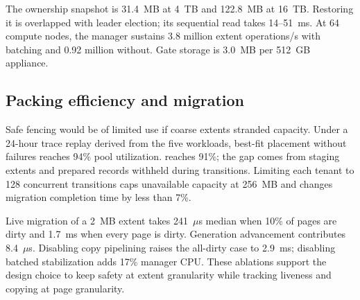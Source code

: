 The ownership snapshot is 31.4~MB at 4~TB and 122.8~MB at 16~TB. Restoring it
is overlapped with leader election; its sequential read takes 14--51~ms. At
64 compute nodes, the manager sustains 3.8 million extent operations/s with
batching and 0.92 million without. Gate storage is 3.0~MB per 512~GB appliance.

\subsection{Packing efficiency and migration}

Safe fencing would be of limited use if coarse extents stranded capacity.
Under a 24-hour trace replay derived from the five workloads, best-fit placement
without failures reaches 94\% pool utilization. \system reaches 91\%; the gap
comes from staging extents and prepared records withheld during transitions.
Limiting each tenant to 128 concurrent transitions caps unavailable capacity at
256~MB and changes migration completion time by less than 7\%.

Live migration of a 2~MB extent takes 241~$\mu$s median when 10\% of pages are
dirty and 1.7~ms when every page is dirty. Generation advancement contributes
8.4~$\mu$s. Disabling copy pipelining raises the all-dirty case to 2.9~ms;
disabling batched stabilization adds 17\% manager CPU. These ablations support
the design choice to keep safety at extent granularity while tracking liveness
and copying at page granularity.

